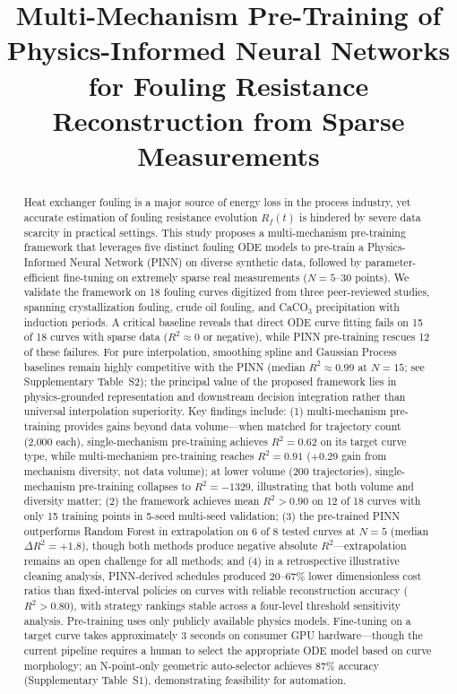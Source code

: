 \documentclass[review]{elsarticle}
\begin{document}
\begin{frontmatter}

\title{Multi-Mechanism Pre-Training of Physics-Informed Neural Networks for Fouling Resistance Reconstruction from Sparse Measurements}


\begin{abstract}
Heat exchanger fouling is a major source of energy loss in the process industry, yet accurate estimation of fouling resistance evolution $R_f(t)$ is hindered by severe data scarcity in practical settings. This study proposes a multi-mechanism pre-training framework that leverages five distinct fouling ODE models to pre-train a Physics-Informed Neural Network (PINN) on diverse synthetic data, followed by parameter-efficient fine-tuning on extremely sparse real measurements ($N = 5$--$30$ points). We validate the framework on 18 fouling curves digitized from three peer-reviewed studies, spanning crystallization fouling, crude oil fouling, and CaCO$_3$ precipitation with induction periods. A critical baseline reveals that direct ODE curve fitting fails on 15 of 18 curves with sparse data ($R^2 \approx 0$ or negative), while PINN pre-training rescues 12 of these failures. For pure interpolation, smoothing spline and Gaussian Process baselines remain highly competitive with the PINN (median $R^2 \approx 0.99$ at $N=15$; see Supplementary Table~S2); the principal value of the proposed framework lies in physics-grounded representation and downstream decision integration rather than universal interpolation superiority. Key findings include: (1) multi-mechanism pre-training provides gains beyond data volume---when matched for trajectory count (2,000 each), single-mechanism pre-training achieves $R^2 = 0.62$ on its target curve type, while multi-mechanism pre-training reaches $R^2 = 0.91$ (+0.29 gain from mechanism diversity, not data volume); at lower volume (200 trajectories), single-mechanism pre-training collapses to $R^2 = -1329$, illustrating that both volume and diversity matter; (2) the framework achieves mean $R^2 > 0.90$ on 12 of 18 curves with only 15 training points in 5-seed multi-seed validation; (3) the pre-trained PINN outperforms Random Forest in extrapolation on 6 of 8 tested curves at $N=5$ (median $\Delta R^2 = +1.8$), though both methods produce negative absolute $R^2$---extrapolation remains an open challenge for all methods; and (4) in a retrospective illustrative cleaning analysis, PINN-derived schedules produced 20--67\% lower dimensionless cost ratios than fixed-interval policies on curves with reliable reconstruction accuracy ($R^2 > 0.80$), with strategy rankings stable across a four-level threshold sensitivity analysis. Pre-training uses only publicly available physics models. Fine-tuning on a target curve takes approximately 3 seconds on consumer GPU hardware---though the current pipeline requires a human to select the appropriate ODE model based on curve morphology; an N-point-only geometric auto-selector achieves 87\% accuracy (Supplementary Table~S1), demonstrating feasibility for automation.
\end{abstract}


\end{frontmatter}
\end{document}
